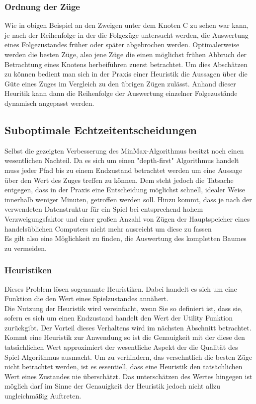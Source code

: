 \subsubsection{Ordnung der Züge}
Wie in obigen Beispiel an den Zweigen unter dem Knoten C zu sehen war kann, je nach der Reihenfolge in der die Folgezüge untersucht werden, die Auswertung eines Folgezustandes früher oder später abgebrochen werden. Optimalerweise werden die besten Züge, also jene Züge die einen möglichst frühen Abbruch der Betrachtung eines Knotens herbeiführen zuerst betrachtet. Um dies Abschätzen zu können bedient man sich in der Praxis einer Heuristik die Aussagen über die Güte eines Zuges im Vergleich zu den übrigen Zügen zulässt. Anhand dieser Heuritik kann dann die Reihenfolge der Auswertung einzelner Folgezustände dynamisch angepasst werden.

\subsection{Suboptimale Echtzeitentscheidungen}
Selbst die gezeigten Verbesserung des MinMax-Algorithmus besitzt noch einen wesentlichen Nachteil. Da es sich um einen "depth-first" Algorithmus handelt muss jeder Pfad bis zu einem Endzustand betrachtet werden um eine Aussage über den Wert des Zuges treffen zu können. Dem steht jedoch die Tatsache entgegen, dass in der Praxis eine Entscheidung möglichst schnell, idealer Weise innerhalb weniger Minuten, getroffen werden soll. Hinzu kommt, dass je nach der verwendeten Datenstruktur für ein Spiel bei entsprechend hohem Verzweigungsfaktor und einer großen Anzahl von Zügen der Hauptspeicher eines handelsüblichen Computers nicht mehr ausreicht um diese zu fassen\\
Es gilt also eine Möglichkeit zu finden, die Auswertung des kompletten Baumes zu vermeiden.

\subsubsection{Heuristiken}
Dieses Problem lösen sogenannte Heuristiken. Dabei handelt es sich um eine Funktion die den Wert eines Spielzustandes annähert.\\
Die Nutzung der Heuristik wird vereinfacht, wenn Sie so definiert ist, dass sie, sofern es sich um einen Endzustand handelt den Wert der Utility Funktion zurückgibt. Der Vorteil dieses Verhaltens wird im nächsten Abschnitt betrachtet.\\
Kommt eine Heuristik zur Anwendung so ist die Genauigkeit mit der diese den tatsächlichen Wert approximiert der wesentliche Aspekt der die Qualität des Spiel-Algorithmus ausmacht. Um zu verhindern, das versehntlich die besten Züge nicht betrachtet werden, ist es essentiell, dass eine Heuristik den tatsächlichen Wert eines Zustandes nie überschätzt. Das unterschätzen des Wertes hingegen ist möglich darf im Sinne der Genauigkeit der Heuristik jedoch nicht allzu ungleichmäßig Auftreten.

